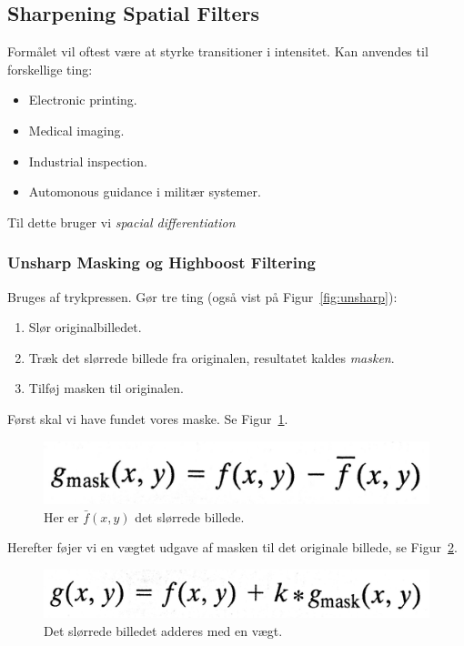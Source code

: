 \subsection{Sharpening Spatial Filters}
Formålet vil oftest være at styrke transitioner i intensitet. Kan anvendes til forskellige ting: 

\begin{itemize}
	\item Electronic printing.
	\item Medical imaging.
	\item Industrial inspection.
	\item Automonous guidance i militær systemer.
\end{itemize}

Til dette bruger vi \textit{spacial differentiation}

\subsubsection{Unsharp Masking og Highboost Filtering}

Bruges af trykpressen. Gør tre ting (også vist på Figur~\ref{fig:unsharp}): 

\begin{enumerate}
	\item Slør originalbilledet.
	\item Træk det slørrede billede fra originalen, resultatet kaldes \textit{masken}.
	\item Tilføj masken til originalen. 
\end{enumerate}

Først skal vi have fundet vores maske. Se Figur~\ref{fig:unsharpeq1}.

\begin{figure}[H]
	\centering
	\includegraphics[width=0.4\linewidth]{figs/spm02/unsharpeq1}
	\caption{Her er $\bar{f}(x,y)$ det slørrede billede.}
	\label{fig:unsharpeq1}
\end{figure}

Herefter føjer vi en vægtet udgave af masken til det originale billede, se Figur~\ref{fig:unsharpeq2}.

\begin{figure}[H]
	\centering
	\includegraphics[width=0.4\linewidth]{figs/spm02/unsharpeq2}
	\caption{Det slørrede billedet adderes med en vægt.}
	\label{fig:unsharpeq2}
\end{figure}

